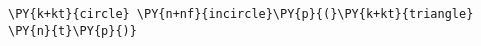 \begin{Verbatim}[commandchars=\\\{\}]
    \PY{k+kt}{circle} \PY{n+nf}{incircle}\PY{p}{(}\PY{k+kt}{triangle} \PY{n}{t}\PY{p}{)}
\end{Verbatim}
